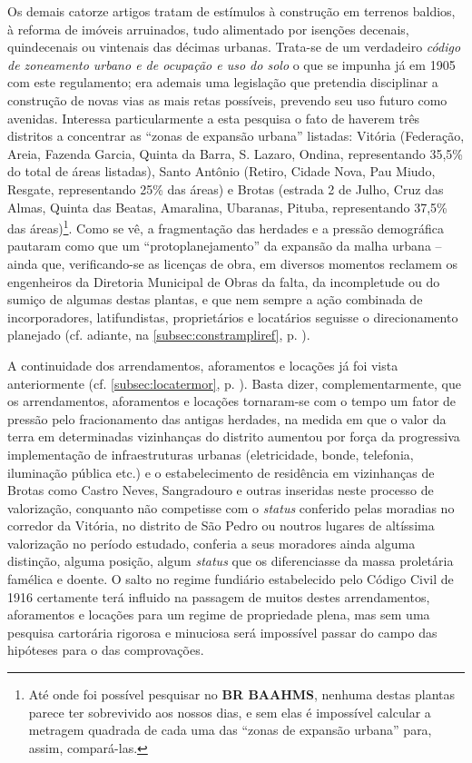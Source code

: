 Os demais catorze artigos tratam de estímulos à construção em terrenos baldios, à reforma de imóveis arruinados, tudo alimentado por isenções decenais, quindecenais ou vintenais das décimas urbanas. Trata-se de um verdadeiro \textit{código de zoneamento urbano e de ocupação e uso do solo} o que se impunha já em 1905 com este regulamento; era ademais uma legislação que pretendia disciplinar a construção de novas vias as mais retas possíveis, prevendo seu uso futuro como avenidas. Interessa particularmente a esta pesquisa o fato de haverem três distritos a concentrar as ``zonas de expansão urbana'' listadas: Vitória (Federação, Areia, Fazenda Garcia, Quinta da Barra, S. Lazaro, Ondina, representando 35,5\% do total de áreas listadas), Santo Antônio (Retiro, Cidade Nova, Pau Miudo, Resgate, representando 25\% das áreas) e Brotas (estrada 2 de Julho, Cruz das Almas, Quinta das Beatas, Amaralina, Ubaranas, Pituba, representando 37,5\% das áreas)\footnote{Até onde foi possível pesquisar no \textbf{BR BAAHMS}, nenhuma destas plantas parece ter sobrevivido aos nossos dias, e sem elas é impossível calcular a metragem quadrada de cada uma das ``zonas de expansão urbana'' para, assim, compará-las.}. Como se vê, a fragmentação das herdades e a pressão demográfica pautaram como que um ``protoplanejamento'' da expansão da malha urbana --  ainda que, verificando-se as licenças de obra, em diversos momentos reclamem os engenheiros da Diretoria Municipal de Obras da falta, da incompletude ou do sumiço de algumas destas plantas, e que nem sempre a ação combinada de incorporadores, latifundistas, proprietários e locatários seguisse o direcionamento planejado (cf. adiante, na \autoref{subsec:constrampliref}, p. \pageref{subsec:constrampliref}). 

A continuidade dos arrendamentos, aforamentos e locações já foi vista anteriormente (cf. \autoref{subsec:locatermor}, p. \pageref{subsec:locatermor}). Basta dizer, complementarmente, que os arrendamentos, aforamentos e locações tornaram-se com o tempo um fator de pressão pelo fracionamento das antigas herdades, na medida em que o valor da terra em determinadas vizinhanças do distrito aumentou por força da progressiva implementação de infraestruturas urbanas (eletricidade, bonde, telefonia, iluminação pública etc.) e o estabelecimento de residência em vizinhanças de Brotas como Castro Neves, Sangradouro e outras inseridas neste processo de valorização, conquanto não competisse com o \textit{status} conferido pelas moradias no corredor da Vitória, no distrito de São Pedro ou noutros lugares de altíssima valorização no período estudado, conferia a seus moradores ainda alguma distinção, alguma posição, algum \textit{status} que os diferenciasse da massa proletária famélica e doente. O salto no regime fundiário estabelecido pelo Código Civil de 1916 certamente terá influido na passagem de muitos destes arrendamentos, aforamentos e locações para um regime de propriedade plena, mas sem uma pesquisa cartorária rigorosa e minuciosa será impossível passar do campo das hipóteses para o das comprovações.

